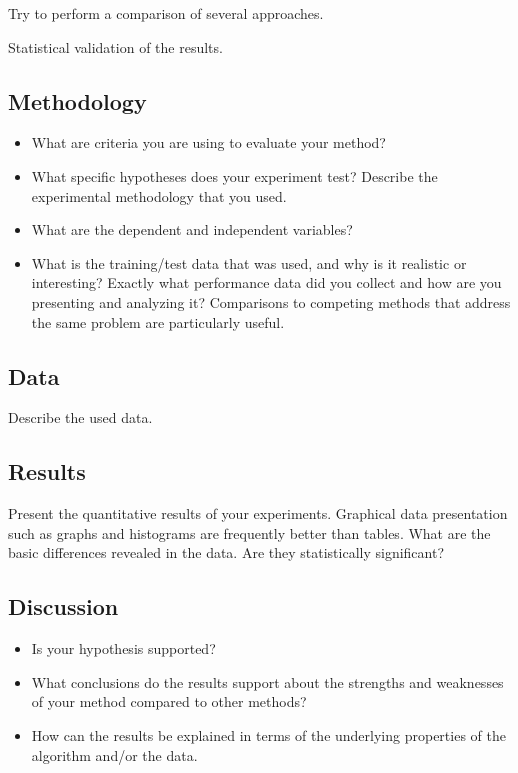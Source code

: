 \documentclass[runningheads,a4paper,11pt]{report}
\begin{document}
Try to perform a comparison of several approaches.

Statistical validation of the results.


\subsection{Methodology}
\label{section:methodology}

\begin{itemize}
	\item What are criteria you are using to evaluate your method? 
	\item What specific hypotheses does your experiment test? Describe the experimental methodology that you used. 
	\item What are the dependent and independent variables? 
	\item What is the training/test data that was used, and why is it realistic or interesting? Exactly what performance data did you collect and how are you presenting and analyzing it? Comparisons to competing methods that address the same problem are particularly useful.
\end{itemize}

\subsection{Data}
\label{section:data}

Describe the used data.

\subsection{Results}
\label{section:results}

Present the quantitative results of your experiments. Graphical data presentation such as graphs and histograms are frequently better than tables. What are the basic differences revealed in the data. Are they statistically significant?

\subsection{Discussion}
\label{section:discussion}

\begin{itemize}
	\item Is your hypothesis supported? 
	\item What conclusions do the results support about the strengths and weaknesses of your method compared to other methods? 
	\item How can the results be explained in terms of the underlying properties of the algorithm and/or the data. 
\end{itemize}
\end{document}
